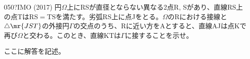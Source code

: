 \begin{prob}{050}{\hosi ?}{IMO (2017)}
 円$\Omega$上にRSが直径とならない異なる2点R, Sがあり、直線RS上の点TはRS$=$TSを満たす。劣弧RS上に点Jをとる。$\Omega$のRにおける接線と$\triangle\mr{JST}$の外接円$\Gamma$の交点のうち、Rに近い方をAとすると、直線AJは点Kで再び$\Omega$と交わる。このとき、直線KTは$\Gamma$に接することを示せ。
\end{prob}
ここに解答を記述。